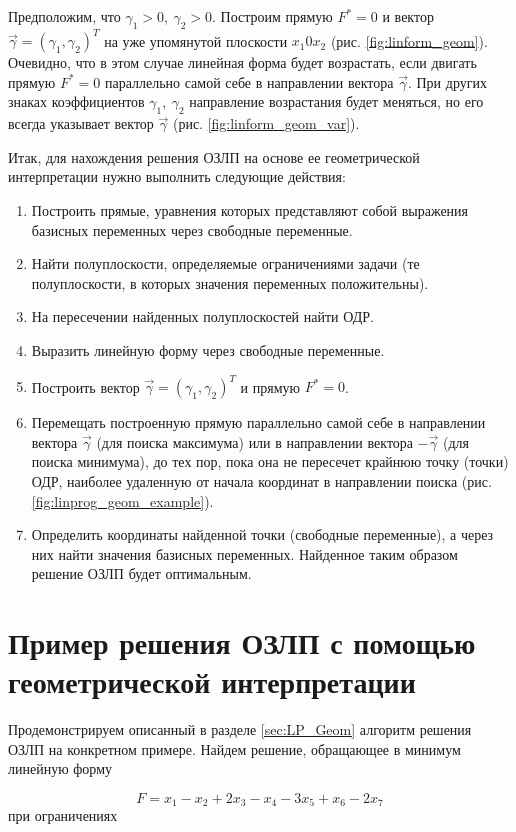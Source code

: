 \documentclass[a4paper,12pt]{report}
\begin{document}
Предположим, что $\gamma_{1} > 0,\ \gamma_{2} > 0$. Построим прямую $F^{*} = 0$ и вектор $\vec{\gamma}=(\gamma_{1}, \gamma_{2})^T$ на уже упомянутой плоскости $x_{1}0x_{2}$ (рис. \ref{fig:linform_geom}). Очевидно, что в этом случае линейная форма будет возрастать, если двигать прямую $F^{*} = 0$ параллельно самой себе в направлении вектора $\vec{\gamma}$. При других знаках коэффициентов $\gamma_{1},\ \gamma_{2}$ направление возрастания будет меняться, но его всегда указывает вектор $\vec{\gamma}$ (рис. \ref{fig:linform_geom_var}).

Итак, для нахождения решения ОЗЛП на основе ее геометрической интерпретации нужно выполнить следующие действия:

\begin{enumerate}
\item Построить прямые, уравнения которых представляют собой выражения базисных переменных через свободные переменные.
\item Найти полуплоскости, определяемые ограничениями задачи (те полуплоскости, в которых значения переменных положительны).
\item На пересечении найденных полуплоскостей найти ОДР.
\item Выразить линейную форму через свободные переменные.
\item Построить вектор $\vec{\gamma}=(\gamma_{1}, \gamma_{2})^T$ и прямую $F^{*} = 0$.
\item Перемещать построенную прямую параллельно самой себе в направлении вектора $\vec{\gamma}$ (для поиска максимума) или в направлении вектора $-\vec{\gamma}$ (для поиска минимума), до тех пор, пока она не пересечет крайнюю точку (точки) ОДР, наиболее удаленную от начала координат в направлении поиска (рис. \ref{fig:linprog_geom_example}).
\item Определить координаты найденной точки (свободные переменные), а через них найти значения базисных переменных. Найденное таким образом решение ОЗЛП будет оптимальным.
\end{enumerate}

\section{Пример решения ОЗЛП с помощью геометрической интерпретации}
Продемонстрируем описанный в разделе \ref{sec:LP_Geom} алгоритм решения ОЗЛП на конкретном примере. Найдем решение, обращающее в минимум линейную форму

\begin{equation*}
F = x_{1} - x_{2} + 2x_{3} - x_{4} - 3x_{5} + x_{6} - 2x_{7}
\end{equation*}
при ограничениях
\end{document}
